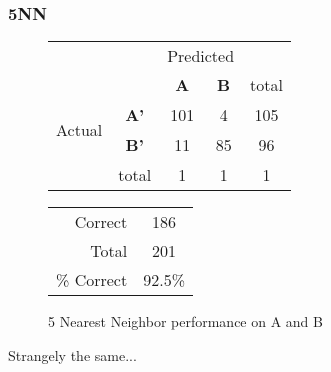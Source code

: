 \subsubsection{5NN}
\begin{figure}[ht]
\begin{minipage}[b]{0.5\linewidth}
\centering
	\begin{tabular}{ccc|c|c}
	 & &\multicolumn{2}{c}{Predicted} &\\
	  & & \bf{A} &  \bf{B} & total \\
	 \cline{3-5}
	 \multirow{2}{*}{\begin{sideways}Actual\end{sideways}} & \bf{A'}& 101 & 4 & 105 \\
	 \cline{3-5}
	 & \bf{B'}& 11 & 85 & 96 \\
	  \cline{3-5}
	 &total&1&1&1\\
	\end{tabular}
\end{minipage}
\hspace{0.5cm}
\begin{minipage}[b]{0.5\linewidth}
	\begin{tabular}{r|c}
	\hline
	Correct& 186\\
	Total& 201\\
	\hline
	\% Correct& 92.5\%\\
	\hline
	\end{tabular}
\end{minipage}
\vspace{1mm}
\caption{5 Nearest Neighbor performance on A and B}
\end{figure}

Strangely the same...

